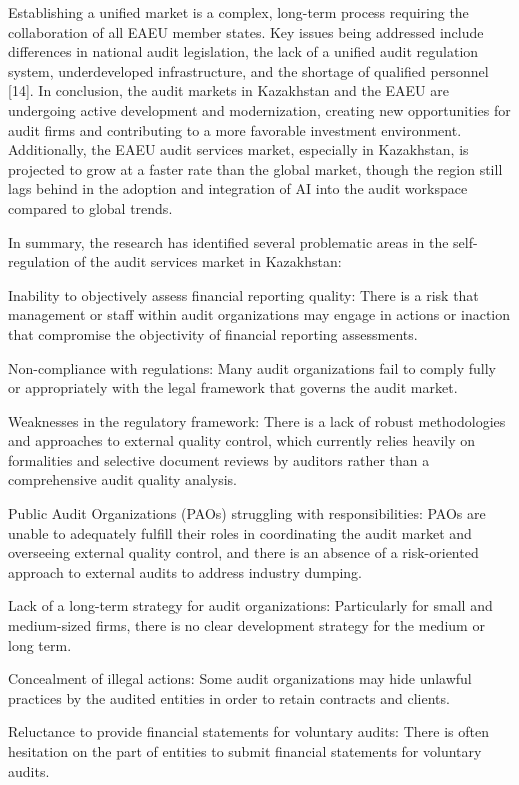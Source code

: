 Establishing a unified market is a complex, long-term process requiring
the collaboration of all EAEU member states. Key issues being addressed
include differences in national audit legislation, the lack of a unified
audit regulation system, underdeveloped infrastructure, and the shortage
of qualified personnel {[}14{]}. In conclusion, the audit markets in
Kazakhstan and the EAEU are undergoing active development and
modernization, creating new opportunities for audit firms and
contributing to a more favorable investment environment. Additionally,
the EAEU audit services market, especially in Kazakhstan, is projected
to grow at a faster rate than the global market, though the region still
lags behind in the adoption and integration of AI into the audit
workspace compared to global trends.

In summary, the research has identified several problematic areas in the
self-regulation of the audit services market in Kazakhstan:

Inability to objectively assess financial reporting quality: There is a
risk that management or staff within audit organizations may engage in
actions or inaction that compromise the objectivity of financial
reporting assessments.

Non-compliance with regulations: Many audit organizations fail to comply
fully or appropriately with the legal framework that governs the audit
market.

Weaknesses in the regulatory framework: There is a lack of robust
methodologies and approaches to external quality control, which
currently relies heavily on formalities and selective document reviews
by auditors rather than a comprehensive audit quality analysis.

Public Audit Organizations (PAOs) struggling with responsibilities: PAOs
are unable to adequately fulfill their roles in coordinating the audit
market and overseeing external quality control, and there is an absence
of a risk-oriented approach to external audits to address industry
dumping.

Lack of a long-term strategy for audit organizations: Particularly for
small and medium-sized firms, there is no clear development strategy for
the medium or long term.

Concealment of illegal actions: Some audit organizations may hide
unlawful practices by the audited entities in order to retain contracts
and clients.

Reluctance to provide financial statements for voluntary audits: There
is often hesitation on the part of entities to submit financial
statements for voluntary audits.

